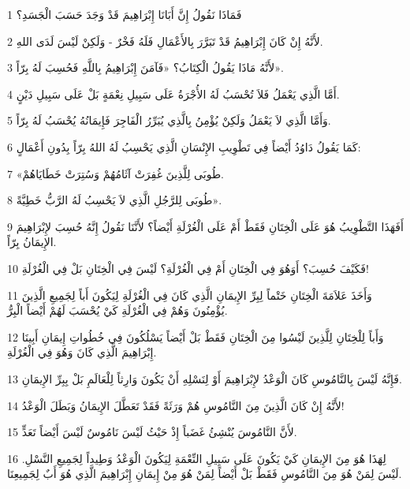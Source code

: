 \par 1 فَمَاذَا نَقُولُ إِنَّ أَبَانَا إِبْرَاهِيمَ قَدْ وَجَدَ حَسَبَ الْجَسَدِ؟
\par 2 لأَنَّهُ إِنْ كَانَ إِبْرَاهِيمُ قَدْ تَبَرَّرَ بِالأَعْمَالِ فَلَهُ فَخْرٌ - وَلَكِنْ لَيْسَ لَدَى اللهِ.
\par 3 لأَنَّهُ مَاذَا يَقُولُ الْكِتَابُ؟ «فَآمَنَ إِبْرَاهِيمُ بِاللَّهِ فَحُسِبَ لَهُ بِرّاً».
\par 4 أَمَّا الَّذِي يَعْمَلُ فَلاَ تُحْسَبُ لَهُ الأُجْرَةُ عَلَى سَبِيلِ نِعْمَةٍ بَلْ عَلَى سَبِيلِ دَيْنٍ.
\par 5 وَأَمَّا الَّذِي لاَ يَعْمَلُ وَلَكِنْ يُؤْمِنُ بِالَّذِي يُبَرِّرُ الْفَاجِرَ فَإِيمَانُهُ يُحْسَبُ لَهُ بِرّاً.
\par 6 كَمَا يَقُولُ دَاوُدُ أَيْضاً فِي تَطْوِيبِ الإِنْسَانِ الَّذِي يَحْسِبُ لَهُ اللهُ بِرّاً بِدُونِ أَعْمَالٍ:
\par 7 «طُوبَى لِلَّذِينَ غُفِرَتْ آثَامُهُمْ وَسُتِرَتْ خَطَايَاهُمْ.
\par 8 طُوبَى لِلرَّجُلِ الَّذِي لاَ يَحْسِبُ لَهُ الرَّبُّ خَطِيَّةً».
\par 9 أَفَهَذَا التَّطْوِيبُ هُوَ عَلَى الْخِتَانِ فَقَطْ أَمْ عَلَى الْغُرْلَةِ أَيْضاً؟ لأَنَّنَا نَقُولُ إِنَّهُ حُسِبَ لإِبْرَاهِيمَ الإِيمَانُ بِرّاً.
\par 10 فَكَيْفَ حُسِبَ؟ أَوَهُوَ فِي الْخِتَانِ أَمْ فِي الْغُرْلَةِ؟ لَيْسَ فِي الْخِتَانِ بَلْ فِي الْغُرْلَةِ!
\par 11 وَأَخَذَ عَلاَمَةَ الْخِتَانِ خَتْماً لِبِرِّ الإِيمَانِ الَّذِي كَانَ فِي الْغُرْلَةِ لِيَكُونَ أَباً لِجَمِيعِ الَّذِينَ يُؤْمِنُونَ وَهُمْ فِي الْغُرْلَةِ كَيْ يُحْسَبَ لَهُمْ أَيْضاً الْبِرُّ.
\par 12 وَأَباً لِلْخِتَانِ لِلَّذِينَ لَيْسُوا مِنَ الْخِتَانِ فَقَطْ بَلْ أَيْضاً يَسْلُكُونَ فِي خُطُواتِ إِيمَانِ أَبِينَا إِبْرَاهِيمَ الَّذِي كَانَ وَهُوَ فِي الْغُرْلَةِ.
\par 13 فَإِنَّهُ لَيْسَ بِالنَّامُوسِ كَانَ الْوَعْدُ لإِبْرَاهِيمَ أَوْ لِنَسْلِهِ أَنْ يَكُونَ وَارِثاً لِلْعَالَمِ بَلْ بِبِرِّ الإِيمَانِ.
\par 14 لأَنَّهُ إِنْ كَانَ الَّذِينَ مِنَ النَّامُوسِ هُمْ وَرَثَةً فَقَدْ تَعَطَّلَ الإِيمَانُ وَبَطَلَ الْوَعْدُ!
\par 15 لأَنَّ النَّامُوسَ يُنْشِئُ غَضَباً إِذْ حَيْثُ لَيْسَ نَامُوسٌ لَيْسَ أَيْضاً تَعَدٍّ.
\par 16 لِهَذَا هُوَ مِنَ الإِيمَانِ كَيْ يَكُونَ عَلَى سَبِيلِ النِّعْمَةِ لِيَكُونَ الْوَعْدُ وَطِيداً لِجَمِيعِ النَّسْلِ. لَيْسَ لِمَنْ هُوَ مِنَ النَّامُوسِ فَقَطْ بَلْ أَيْضاً لِمَنْ هُوَ مِنْ إِيمَانِ إِبْرَاهِيمَ الَّذِي هُوَ أَبٌ لِجَمِيعِنَا.
